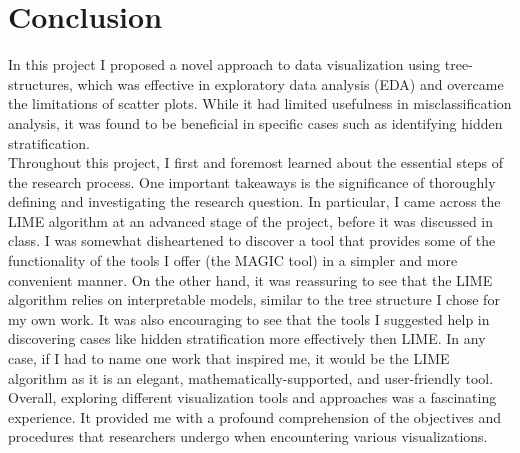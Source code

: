\documentclass[11pt]{article}
\begin{document}
\section{Conclusion}\label{Conclusion}
In this project I proposed a novel approach to data visualization using tree-structures, which was effective in exploratory data analysis (EDA) and overcame the limitations of scatter plots. While it had limited usefulness in misclassification analysis, it was found to be beneficial in specific cases such as identifying hidden stratification.\\
Throughout this project, I first and foremost learned about the essential steps of the research process. One important takeaways is the significance of thoroughly defining and investigating the research question. In particular, I came across the LIME algorithm at an advanced stage of the project, before it was discussed in class. I was somewhat disheartened to discover a tool that provides some of the functionality of the tools I offer (the MAGIC tool) in a simpler and more convenient manner. On the other hand, it was reassuring to see that the LIME algorithm relies on interpretable models, similar to the tree structure I chose for my own work. It was also encouraging to see that the tools I suggested help in discovering cases like hidden stratification more effectively then LIME. In any case, if I had to name one work that inspired me, it would be the LIME algorithm as it is an elegant, mathematically-supported, and user-friendly tool.\\
Overall, exploring different visualization tools and approaches was a fascinating experience. It provided me with a profound comprehension of the objectives and procedures that researchers undergo when encountering various visualizations.




\end{document}
